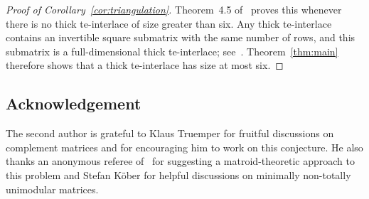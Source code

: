 \documentclass{amsart}
\numberwithin{equation}{section}
\begin{document}
\begin{proof}[Proof of Corollary~\ref{cor:triangulation}]
    Theorem~4.5 of~\cite{Chervet_Grappe_Vallee_2026} proves this whenever there is no thick te-interlace of size greater than six.
    Any thick te-interlace contains an invertible square submatrix with the same number of rows, and this submatrix is a full-dimensional thick te-interlace; see~\cite[Corollary~3.34]{Chervet_Grappe_Vallee_2026}.
    Theorem~\ref{thm:main} therefore shows that a thick te-interlace has size at most six.
\end{proof}


\subsection*{Acknowledgement}
The second author is grateful to Klaus Truemper for fruitful discussions on complement matrices and for encouraging him to work on this conjecture.
He also thanks an anonymous referee of~\cite{Chervet_Grappe_Vallee_2026} for suggesting a matroid-theoretic approach to this problem and Stefan K\"ober for helpful discussions on minimally non-totally unimodular matrices.
\end{document}
